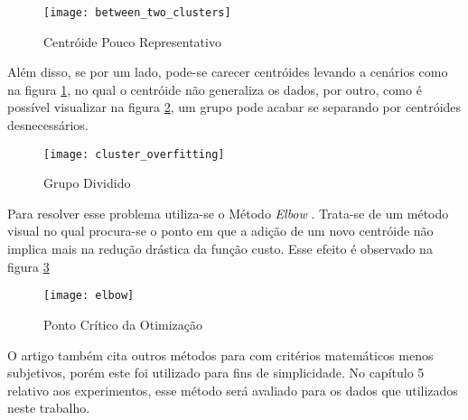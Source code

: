 \begin{figure}
\texttt{[image: between\_two\_clusters]}
\caption[Centróide Pouco Representativo]{Centróide Pouco Representativo} \label{fig:between_two_clusters}
\end{figure}

Além disso, se por um lado, pode-se carecer centróides levando a cenários como na figura \ref{fig:between_two_clusters}, no qual o centróide não generaliza os dados, por outro, como é possível visualizar na figura \ref{fig:cluster_overfitting}, um grupo pode acabar se separando por centróides desnecessários.

\begin{figure}[htbp]
\centering
\texttt{[image: cluster\_overfitting]}
\caption[Grupo Dividido]{Grupo Dividido} \label{fig:cluster_overfitting}
\end{figure}

Para resolver esse problema utiliza-se o Método \textit{Elbow} \citep{kodinariya2013review}. Trata-se de um método visual no qual procura-se o ponto em que a adição de um novo centróide não implica mais na redução drástica da função custo. Esse efeito é observado na figura \ref{fig:elbow}

\begin{figure}[htbp]
\centering
\texttt{[image: elbow]}
\caption[Ponto Crítico da Otimização]{Ponto Crítico da Otimização} \label{fig:elbow}
\end{figure}

O artigo \citep{kodinariya2013review} também cita outros métodos para com critérios matemáticos menos subjetivos, porém este foi utilizado para fins de simplicidade. No capítulo 5 relativo aos experimentos, esse método será avaliado para os dados que utilizados neste trabalho.